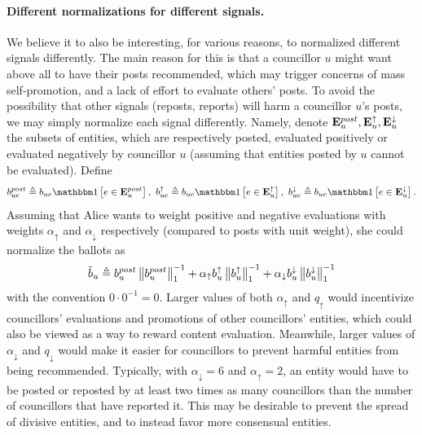 \paragraph{Different normalizations for different signals.}
We believe it to also be interesting, for various reasons,
to normalized different signals differently.
The main reason for this is that a councillor $u$ might want above all to have their posts recommended,
which may trigger concerns of mass self-promotion,
and a lack of effort to evaluate others' posts.
To avoid the possibility that other signals (reposts, reports) will harm a councillor $u$'s posts,
we may simply normalize each signal differently.
Namely, denote ${\bf E}_u^{post}, {\bf E}_u^{\uparrow}, {\bf E}_u^{\downarrow}$ the subsets of entities,
which are respectively posted, evaluated positively or evaluated negatively by councillor $u$
(assuming that entities posted by $u$ cannot be evaluated).
Define
\begin{align}
    b_{ue}^{post} \triangleq b_{ue} \indicator{e \in \bE_u^{post}} \mathsep
    b_{ue}^{\uparrow} \triangleq b_{ue} \indicator{e \in \bE_u^{\uparrow}} \mathsep
    b_{ue}^{\downarrow} \triangleq b_{ue} \indicator{e \in \bE_u^{\downarrow}}.
\end{align}
Assuming that Alice wants to weight positive and negative evaluations
with weights $\alpha_{\uparrow}$ and $\alpha_{\downarrow}$ respectively 
(compared to posts with unit weight),
she could normalize the ballots as
\begin{align}
    \tilde b_u 
    \triangleq  
        b_u^{post} \left\lVert{b_u^{post}}\right\rVert_{1}^{-1}
        + \alpha_\uparrow b_u^\uparrow \left\lVert{b_u^\uparrow}\right\rVert_{1}^{-1}
        + \alpha_\downarrow b_u^\downarrow \left\lVert{b_u^\downarrow}\right\rVert_{1}^{-1}
\end{align}
with the convention $0 \cdot 0^{-1} = 0$.
Larger values of both $\alpha_\uparrow$ and $q_\uparrow$ would incentivize
councillors' evaluations and promotions of other councillors' entities,
which could also be viewed as a way to reward content evaluation.
Meanwhile, larger values of $\alpha_\downarrow$ and $q_\downarrow$ 
would make it easier for councillors 
to prevent harmful entities from being recommended.
Typically, with $\alpha_\downarrow = 6$ and $\alpha_\uparrow = 2$, 
an entity would have to be posted or reposted
by at least two times as many councillors 
than the number of councillors that have reported it.
This may be desirable to prevent the spread of divisive entities,
and to instead favor more consensual entities.

